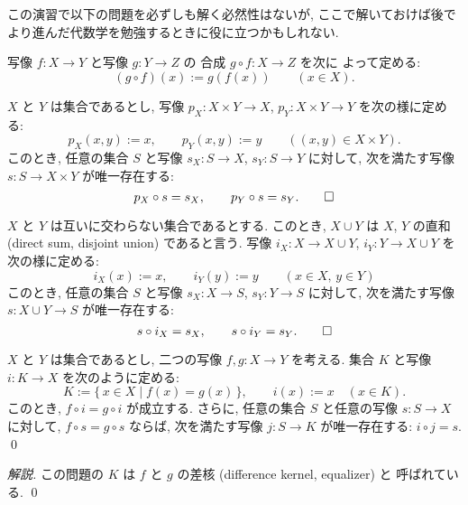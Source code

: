\documentclass[12pt,twoside]{jarticle}
\begin{document}
\bigskip

この演習で以下の問題を必ずしも解く必然性はないが, 
ここで解いておけば後でより進んだ代数学を勉強するときに役に立つかもしれない.

\par\medskip\noindent
写像 $f\colon X\to Y$ と写像 $g\colon Y\to Z$ の
合成 $g\circ f\colon X\to Z$ を次に
よって定める:
\[
  (g\circ f)(x) := g(f(x))
  \qquad (x\in X).
\]


\begin{question}[10点]
$X$ と $Y$ は集合であるとし, 
写像 $p_X\colon X\times Y\to X$, $p_Y\colon X\times Y\to Y$ 
を次の様に定める:
\[
  p_X(x,y) := x, \qquad p_Y(x,y):= y
  \qquad ((x,y)\in X\times Y).
\]
このとき, 任意の集合 $S$ 
と写像 $s_X\colon S\to X$, $s_Y\colon S\to Y$ に対して, 
次を満たす写像 $s\colon S\to X\times Y$ が唯一存在する:
\[
  p_X \circ s = s_X, \qquad  p_Y \circ s = s_Y.
  \qed
\]
\end{question}



\begin{question}[10点]
\label{q:9}
$X$ と $Y$ は互いに交わらない集合であるとする. 
このとき, $X\cup Y$ は $X$, $Y$ の直和 (direct sum, disjoint union)
であると言う. 
写像 $i_X\colon X\to X\cup Y$, $i_Y\colon Y\to X\cup Y$ 
を次の様に定める:
\[
  i_X(x) := x, \qquad i_Y(y):= y
  \qquad (x\in X,\, y\in Y)
\]
このとき, 任意の集合 $S$ 
と写像 $s_X\colon X\to S$, $s_Y\colon Y\to S$ に対して, 
次を満たす写像 $s\colon X\cup Y\to S$ が唯一存在する:
\[
  s \circ i_X = s_X, \qquad  s \circ i_Y = s_Y.
  \qed
\]
\end{question}


\begin{question}[10点]
\label{q:10}
$X$ と $Y$ は集合であるとし, 二つの写像 $f,g\colon X\to Y$ を考える. 
集合 $K$ と写像 $i\colon K\to X$ を次のように定める:
\[
  K := \{\,x\in X \mid f(x)=g(x)\,\},
  \qquad
  i(x) := x \quad (x\in K).
\]
このとき, $f\circ i = g\circ i$ が成立する. 
さらに, 任意の集合 $S$ と任意の写像 $s\colon S\to X$ に対して, 
$f\circ s = g\circ s$ ならば, 
次を満たす写像 $j\colon S\to K$ が唯一存在する: $i\circ j = s$.
\qed
\end{question}


\begin{proof}[解説]
この問題の $K$ は $f$ と $g$ の差核 (difference kernel, equalizer) と
呼ばれている. \qed
\end{proof}
\end{document}
